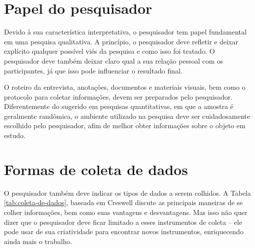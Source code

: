 \section{Papel do pesquisador}

Devido à sua característica interpretativa, o pesquisador tem papel fundamental
em uma pesquisa qualitativa. A princípio, o pesquisador deve refletir e
deixar explícito qualquer possível viés da pesquisa e como isso foi tratado.
O pesquisador deve também deixar claro qual a sua relação
pessoal com os participantes, já que isso pode influenciar o resultado final.

O roteiro da entrevista, anotações, documentos e materiais visuais, bem como o
protocolo para coletar informações, devem ser preparados pelo pesquisador.
Diferentemente do sugerido em pesquisas quantitativas, em que a amostra é
geralmente randômica, o ambiente utilizado na pesquisa deve ser cuidadosamente
escolhido pelo pesquisador, afim de melhor obter informações sobre o objeto em
estudo. 

\section{Formas de coleta de dados}

O pesquisador também deve indicar os tipos de dados a serem colhidos. A Tabela
\ref{tab:coleta-de-dados}, baseada em Creswell \cite{creswell} discute as
principais maneiras de se colher informações, bem como suas vantagens e
desvantagens. Mas isso não quer dizer que o pesquisador deve ficar limitado a
esses instrumentos de coleta -- ele pode usar de sua criatividade para encontrar
novos instrumentos, enriquecendo ainda mais o trabalho.

